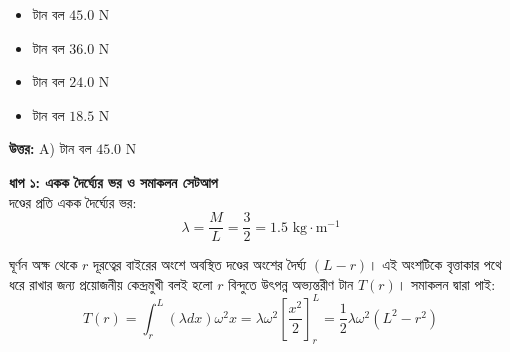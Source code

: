 \documentclass[12pt, a4paper]{article}
\begin{document}
{{\begin{center}
\end{center}
\vspace{1.5em}

\begin{itemize}[label={}, leftmargin=1cm, itemsep=0.5em]
    \item[\textbf{A)}] টান বল $45.0\text{ N}$
    \item[\textbf{B)}] টান বল $36.0\text{ N}$
    \item[\textbf{C)}] টান বল $24.0\text{ N}$
    \item[\textbf{D)}] টান বল $18.5\text{ N}$
\end{itemize}

\vspace{0.5em}
\begin{tcolorbox}[answerbox]
    \textbf{\color{success} উত্তর:} A) টান বল $45.0\text{ N}$
\end{tcolorbox}
\vspace{1em}

\begin{tcolorbox}[solutionbox={সমাধান (Solution)}]
    \noindent
    \textbf{ধাপ ১: একক দৈর্ঘ্যের ভর ও সমাকলন সেটআপ} \\
    দণ্ডের প্রতি একক দৈর্ঘ্যের ভর:
    \[ \lambda = \frac{M}{L} = \frac{3}{2} = 1.5\text{ kg}\cdot\text{m}^{-1} \]
    
    ঘূর্ণন অক্ষ থেকে $r$ দূরত্বের বাইরের অংশে অবস্থিত দণ্ডের অংশের দৈর্ঘ্য $(L - r)$। এই অংশটিকে বৃত্তাকার পথে ধরে রাখার জন্য প্রয়োজনীয় কেন্দ্রমুখী বলই হলো $r$ বিন্দুতে উৎপন্ন অভ্যন্তরীণ টান $T(r)$। সমাকলন দ্বারা পাই:
    \[ T(r) = \int_r^L (\lambda dx) \omega^2 x = \lambda \omega^2 \left[ \frac{x^2}{2} \right]_r^L = \frac{1}{2} \lambda \omega^2 (L^2 - r^2) \]
    

\end{tcolorbox}}}
\end{document}
